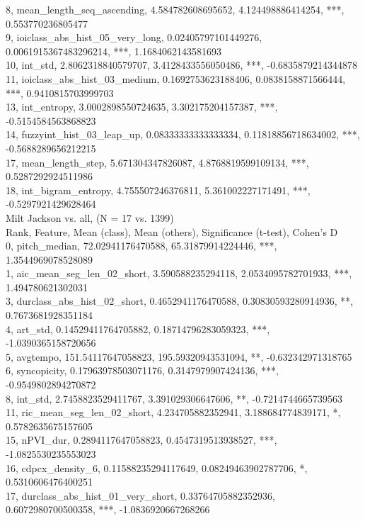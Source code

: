 8, mean_length_seq_ascending, 4.584782608695652, 4.124498886414254, ***, 0.553770236805477\\
9, ioiclass_abs_hist_05_very_long, 0.02405797101449276, 0.0061915367483296214, ***, 1.1684062143581693\\
10, int_std, 2.8062318840579707, 3.4128433556050486, ***, -0.6835879214344878\\
11, ioiclass_abs_hist_03_medium, 0.1692753623188406, 0.0838158871566444, ***, 0.9410815703999703\\
13, int_entropy, 3.0002898550724635, 3.302175204157387, ***, -0.5154584563868823\\
14, fuzzyint_hist_03_leap_up, 0.08333333333333334, 0.11818856718634002, ***, -0.5688289656212215\\
17, mean_length_step, 5.671304347826087, 4.8768819599109134, ***, 0.5287292924511986\\
18, int_bigram_entropy, 4.755507246376811, 5.361002227171491, ***, -0.5297921429628464\\
Milt Jackson vs. all, (N = 17 vs. 1399)\\
Rank, Feature, Mean (class), Mean (others), Significance (t-test), Cohen's D\\
0, pitch_median, 72.02941176470588, 65.31879914224446, ***, 1.3544969078528089\\
1, aic_mean_seg_len_02_short, 3.590588235294118, 2.0534095782701933, ***, 1.494780621302031\\
3, durclass_abs_hist_02_short, 0.4652941176470588, 0.30830593280914936, **, 0.7673681928351184\\
4, art_std, 0.14529411764705882, 0.18714796283059323, ***, -1.0390365158720656\\
5, avgtempo, 151.54117647058823, 195.59320943531094, **, -0.632342971318765\\
6, syncopicity, 0.17963978503071176, 0.3147979907424136, ***, -0.9549802894270872\\
8, int_std, 2.7458823529411767, 3.391029306647606, **, -0.7214744665739563\\
11, ric_mean_seg_len_02_short, 4.234705882352941, 3.188684774839171, *, 0.5782635675157605\\
15, nPVI_dur, 0.2894117647058823, 0.4547319513938527, ***, -1.0825530235553023\\
16, cdpcx_density_6, 0.11588235294117649, 0.08249463902787706, *, 0.5310606476400251\\
17, durclass_abs_hist_01_very_short, 0.33764705882352936, 0.6072980700500358, ***, -1.0836920667268266\\
